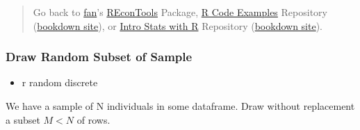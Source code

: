 \documentclass[
]{book}
\newenvironment{Shaded}{\begin{snugshade}}{\end{snugshade}}
\newcommand{\CommentTok}[1]{\textcolor[rgb]{0.56,0.35,0.01}{\textit{#1}}}
\newcommand{\DataTypeTok}[1]{\textcolor[rgb]{0.13,0.29,0.53}{#1}}
\newcommand{\DecValTok}[1]{\textcolor[rgb]{0.00,0.00,0.81}{#1}}
\newcommand{\KeywordTok}[1]{\textcolor[rgb]{0.13,0.29,0.53}{\textbf{#1}}}
\newcommand{\NormalTok}[1]{#1}
\newcommand{\OperatorTok}[1]{\textcolor[rgb]{0.81,0.36,0.00}{\textbf{#1}}}
\newcommand{\OtherTok}[1]{\textcolor[rgb]{0.56,0.35,0.01}{#1}}
\newcommand{\StringTok}[1]{\textcolor[rgb]{0.31,0.60,0.02}{#1}}
\providecommand{\tightlist}{%
  \setlength{\itemsep}{0pt}\setlength{\parskip}{0pt}}
\begin{document}
\begin{quote}
Go back to \href{http://fanwangecon.github.io/}{fan}'s \href{https://fanwangecon.github.io/REconTools/}{REconTools} Package, \href{https://fanwangecon.github.io/R4Econ/}{R Code Examples} Repository (\href{https://fanwangecon.github.io/R4Econ/bookdown}{bookdown site}), or \href{https://fanwangecon.github.io/Stat4Econ/}{Intro Stats with R} Repository (\href{https://fanwangecon.github.io/Stat4Econ/bookdown}{bookdown site}).
\end{quote}

\hypertarget{draw-random-subset-of-sample}{%
\subsubsection{Draw Random Subset of Sample}\label{draw-random-subset-of-sample}}

\begin{itemize}
\tightlist
\item
  r random discrete
\end{itemize}

We have a sample of N individuals in some dataframe. Draw without replacement a subset \(M<N\) of rows.

\begin{Shaded}
\end{Shaded}
\end{document}
